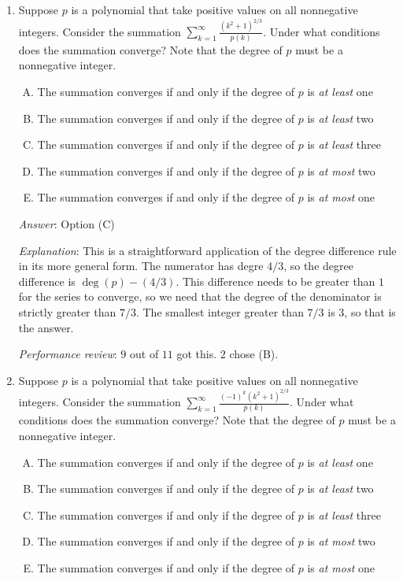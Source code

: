 \documentclass[10pt]{amsart}
\begin{document}
\begin{enumerate}

\item Suppose $p$ is a polynomial that take positive values on all
  nonnegative integers. Consider the summation $\sum_{k=1}^\infty
  \frac{(k^2 + 1)^{2/3}}{p(k)}$. Under what conditions does the
  summation converge? Note that the degree of $p$ must be a
  nonnegative integer.

  \begin{enumerate}[(A)]
  \item The summation converges if and only if the degree of $p$ is
    {\em at least} one
  \item The summation converges if and only if the degree of $p$ is
    {\em at least} two
  \item The summation converges if and only if the degree of $p$ is
    {\em at least} three
  \item The summation converges if and only if the degree of $p$ is
    {\em at most} two
  \item The summation converges if and only if the degree of $p$ is
    {\em at most} one
  \end{enumerate}

  {\em Answer}: Option (C)

  {\em Explanation}: This is a straightforward application of the
  degree difference rule in its more general form. The numerator has
  degre $4/3$, so the degree difference is $\operatorname{deg}(p) -
  (4/3)$. This difference needs to be greater than $1$ for the series
  to converge, so we need that the degree of the denominator is
  strictly greater than $7/3$. The smallest integer greater than $7/3$
  is $3$, so that is the answer.

  {\em Performance review}: $9$ out of $11$ got this. $2$ chose (B).

\item Suppose $p$ is a polynomial that take positive values on all
  nonnegative integers. Consider the summation $\sum_{k=1}^\infty
  \frac{(-1)^k(k^2 + 1)^{2/3}}{p(k)}$. Under what conditions does the
  summation converge? Note that the degree of $p$ must be a
  nonnegative integer.

  \begin{enumerate}[(A)]
  \item The summation converges if and only if the degree of $p$ is
    {\em at least} one
  \item The summation converges if and only if the degree of $p$ is
    {\em at least} two
  \item The summation converges if and only if the degree of $p$ is
    {\em at least} three
  \item The summation converges if and only if the degree of $p$ is
    {\em at most} two
  \item The summation converges if and only if the degree of $p$ is
    {\em at most} one
  \end{enumerate}


\end{enumerate}
\end{document}
